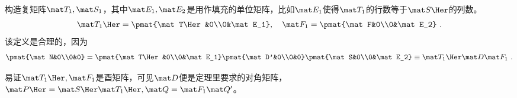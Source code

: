 构造复矩阵$\mat T_1,\mat S_1$，其中$\mat E_1,\mat E_2$是用作填充的单位矩阵，比如$\mat E_1$使得$\mat T_1$的行数等于$\mat S\Her $的列数。
\begin{equation}
\mat T_1\Her =\pmat{\mat T\Her &0\\0&\mat E_1},\quad \mat F_1=\pmat{\mat F&0\\0&\mat E_2}
~.
\end{equation}
该定义是合理的，因为
\begin{equation}
\pmat{\mat  N&0\\0&0}=\pmat{\mat  T\Her &0\\0&\mat E_1}\pmat{\mat D'&0\\0&0}\pmat{\mat S&0\\0&\mat  E_2}\equiv \mat T_1\Her\mat  D\mat F_1~.
\end{equation}

易证$\mat T_1\Her ,\mat F_1$是酉矩阵，可见$\mat D$便是定理里要求的对角矩阵，$\mat P\Her =\mat S\Her \mat T_1\Her ,\mat Q=\mat  F_1\mat Q'$。
